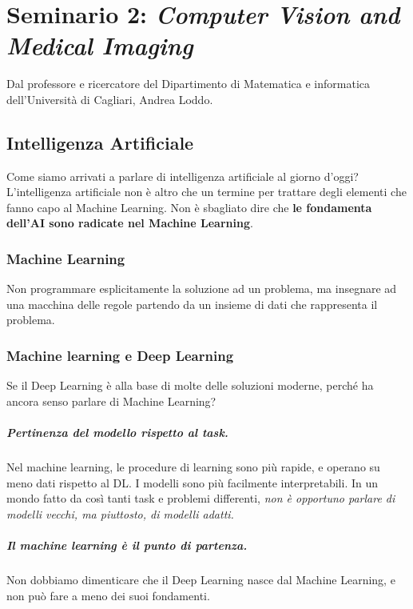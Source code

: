 \chapter{Seminario 2: \textit{Computer Vision and Medical Imaging}}

Dal professore e ricercatore del Dipartimento di Matematica e informatica dell'Università di Cagliari, Andrea Loddo.

\section{Intelligenza Artificiale}
Come siamo arrivati a parlare di intelligenza artificiale al giorno d'oggi? L'intelligenza artificiale non è altro che un termine per trattare degli elementi che fanno capo al Machine Learning.
Non è sbagliato dire che \textbf{le fondamenta dell'AI sono radicate nel Machine Learning}.

\subsection{Machine Learning}
Non programmare esplicitamente la soluzione ad un problema, ma insegnare ad una macchina  delle regole partendo da un insieme di dati che rappresenta il problema. 

\subsection{Machine learning e Deep Learning}

Se il Deep Learning è alla base di molte delle soluzioni moderne, perché ha ancora senso parlare di Machine Learning?

\paragraph{Pertinenza del modello rispetto al task.} Nel machine learning, le procedure di learning sono più rapide, e operano su meno dati rispetto al DL. I modelli sono più facilmente interpretabili. In un mondo fatto da così tanti task e problemi differenti, \textit{non è opportuno parlare di modelli vecchi, ma piuttosto, di modelli adatti.} 

\paragraph{Il machine learning è il punto di partenza.} Non dobbiamo dimenticare che il Deep Learning nasce dal Machine Learning, e non può fare a meno dei suoi fondamenti.


